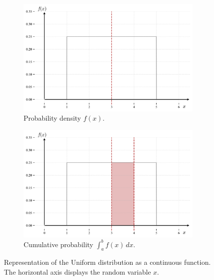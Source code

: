 \documentclass{book}
\begin{document}
\begin{figure}[ht]
    \centering
    \begin{subfigure}[b]{0.48\textwidth}
        \centering
        \includegraphics[width=\textwidth, height=0.7\textwidth]{figures/chapter2/uniform_1.png}
        \caption{Probability density $f(x)$.}
        \label{fig:uniform1}
    \end{subfigure}
    \hfill
    \begin{subfigure}[b]{0.48\textwidth}
        \centering
        \includegraphics[width=\textwidth, height=0.7\textwidth]{figures/chapter2/uniform_2.png}
        \caption{Cumulative probability $\int_a^b f(x) \, dx$.}
        \label{fig:uniform2}
    \end{subfigure}
    \caption{Representation of the Uniform distribution as a continuous function. The horizontal axis displays the random variable $x$.}
    \label{fig:uniform_comparison}
\end{figure}
\end{document}
